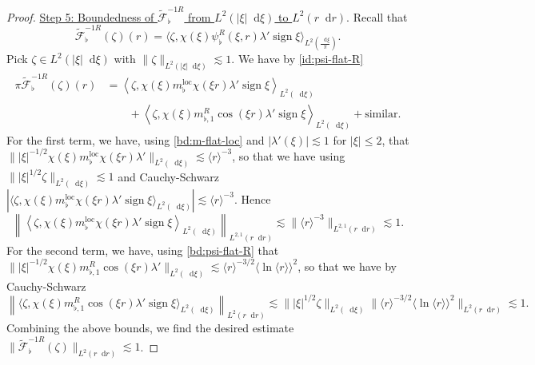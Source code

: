 \documentclass[11 pt]{amsart}
\newcommand{\tmop}[1]{\ensuremath{\operatorname{#1}}}
\theoremstyle{definition}
\theoremstyle{remark}
\numberwithin{equation}{section}
\newcommand{\dd}{\mathop{}\!\mathrm{d}}
\begin{document}
\begin{proof}
\medskip

\noindent \underline{Step 5: Boundedness of $\widetilde{\mathcal F}^{-1R}_\flat$ from $L^2(|\xi|\dd \xi)$ to $L^{2}(r\dd r)$}. Recall that 
$$\widetilde{\mathcal{F}}^{-1R}_\flat (\zeta)(r) =  \langle \zeta , \chi(\xi)\psi_\flat^R(\xi,r) \lambda' \operatorname{sign} \xi \rangle_{L^2(\frac{\dd \xi}{\pi})}.$$
Pick $\zeta \in L^2(|\xi|\dd \xi)$ with $\| \zeta \|_{L^2(|\xi|\dd \xi)}\lesssim 1$. We have by \eqref{id:psi-flat-R}
\begin{align} \label{id:psiRflat-phi-expression-10}
\pi \widetilde{\mathcal{F}}^{-1R}_\flat (\zeta)(r)  & = \left\langle \zeta,  \chi(\xi) m_{\flat}^{\tmop{loc}}  \chi (\xi r) \lambda' \operatorname{sign} \xi \right\rangle_{L^2(\dd \xi)}\\
\nonumber   &\qquad +\left\langle \zeta,  \chi(\xi) m_{\flat, 1}^R \cos (\xi r) \lambda' \operatorname{sign} \xi\right\rangle_{L^2(\dd \xi)}+\mbox{similar}.
\end{align}
For the first term, we have, using \eqref{bd:m-flat-loc} and $|\lambda'(\xi)|\lesssim 1$ for $|\xi|\leq 2$, that $\| |\xi|^{-1/2}  \chi(\xi) m_{\flat}^{\tmop{loc}}  \chi (\xi r) \lambda' \|_{L^2(\dd \xi)}\lesssim \langle r \rangle^{-3}$, so that we have using $\| |\xi|^{1/2}\zeta\|_{L^2(\dd \xi)}\lesssim 1$ and Cauchy-Schwarz $|\langle \zeta,  \chi(\xi) m_{\flat}^{\tmop{loc}}  \chi (\xi r) \lambda' \operatorname{sign} \xi \rangle_{L^2(\dd \xi)}|\lesssim \langle r \rangle^{-3}$. Hence
\begin{equation} \label{courmayeur2000}
\left\| \left\langle \zeta,  \chi(\xi) m_{\flat}^{\tmop{loc}}  \chi (\xi r) \lambda' \operatorname{sign} \xi \right\rangle_{L^2(\dd \xi)}\right\|_{L^{2,1}(r\dd r)}\lesssim \| \langle r \rangle^{-3}\|_{L^{2,1}(r\dd r)}\lesssim 1.
\end{equation}
For the second term, we have, using \eqref{bd:psi-flat-R} that $\| |\xi|^{-1/2} \chi(\xi) m_{\flat, 1}^R \cos (\xi r) \lambda' \|_{L^2(\dd \xi)}\lesssim \langle r \rangle^{-3/2}\langle \ln \langle r \rangle\rangle^2$, so that we have by Cauchy-Schwarz
$$
\left\| \langle \zeta,  \chi(\xi) m_{\flat, 1}^R \cos (\xi r) \lambda' \operatorname{sign} \xi\rangle_{L^2(\dd \xi)}\right\|_{L^2(r\dd r)}\lesssim \| |\xi|^{1/2} \zeta\|_{L^2(\dd \xi)} \|  \langle r \rangle^{-3/2}\langle \ln \langle r \rangle\rangle^2\|_{L^2(r\dd r)}\lesssim 1.
$$
Combining the above bounds, we find the desired estimate $\|\widetilde{\mathcal{F}}^{-1R}_\flat (\zeta) \|_{L^2(r\dd r)}\lesssim 1$.
\end{proof}
\end{document}
